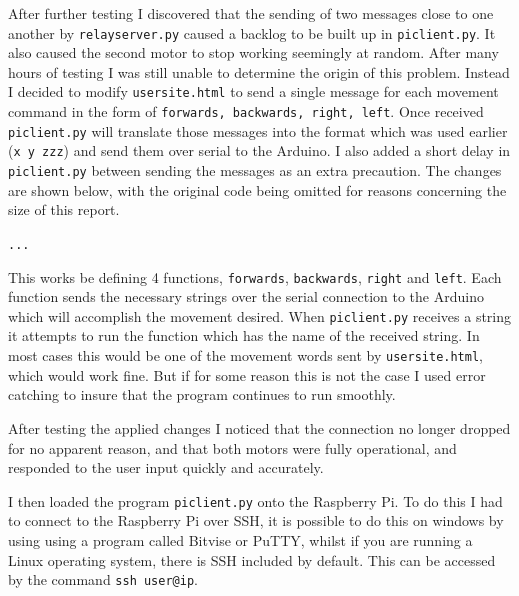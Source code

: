 \documentclass[]{report}   %
\begin{document}
						After further testing I discovered that the sending of two messages close to one another by \lstinline{relayserver.py} caused a backlog
						to be built up in \lstinline{piclient.py}. It also caused the second motor to stop working seemingly at random. After many hours of
						testing I was still unable to determine the origin of this problem. Instead I decided to modify \lstinline{usersite.html} to send a
						single message for each movement command in the form of \lstinline{forwards, backwards, right, left}. Once received
						\lstinline{piclient.py} will translate those messages into the format which was used earlier (\lstinline{x y zzz}) and send them
						over serial to the Arduino. I also added a short delay in \lstinline{piclient.py} between sending the messages as an extra precaution.
						The changes are shown below, with the original code being omitted for reasons concerning the size of this report.
						
						
						\lstinline{...}
						
						
						This works be defining 4 functions, \lstinline{forwards}, \lstinline{backwards}, \lstinline{right} and \lstinline{left}. Each function
						sends the necessary strings over the serial connection to the Arduino which will accomplish the movement desired. When
						\lstinline{piclient.py} receives a string it attempts to run the function which has the name of the received string. In most cases this
						would be one of the movement words sent by \lstinline{usersite.html}, which would work fine. But if for some reason this is not the case
						I used error catching to insure that the program continues to run smoothly.
						
						After testing the applied changes I noticed that the connection no longer dropped for no apparent reason, and that both motors were
						fully operational, and responded to the user input quickly and accurately.
						
						I then loaded the program \lstinline{piclient.py} onto the Raspberry Pi. To do this I had to connect to the Raspberry Pi over SSH, it is
						possible to do this on windows by using using a program called Bitvise or PuTTY, whilst if you are running a Linux operating system, there
						is SSH included by default. This can be accessed by the command \lstinline{ssh user@ip}.
						
\end{document}
